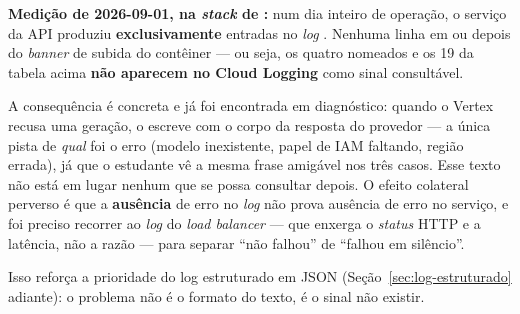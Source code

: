 \begin{atencao}
\textbf{Medição de 2026-09-01, na \emph{stack} de :} num dia inteiro
de operação, o serviço da API produziu \textbf{exclusivamente} entradas no
\emph{log} . Nenhuma linha em
 ou  depois do \emph{banner} de subida do
contêiner --- ou seja, os quatro  nomeados e os 19 
da tabela acima \textbf{não aparecem no Cloud Logging} como sinal consultável.

A consequência é concreta e já foi encontrada em diagnóstico: quando o Vertex
recusa uma geração, o  escreve
 com o corpo da resposta do provedor --- a
única pista de \emph{qual} foi o erro (modelo inexistente, papel de IAM
faltando, região errada), já que o estudante vê a mesma frase amigável nos três
casos. Esse texto não está em lugar nenhum que se possa consultar depois. O
efeito colateral perverso é que a \textbf{ausência} de erro no \emph{log} não
prova ausência de erro no serviço, e foi preciso recorrer ao \emph{log} do
\emph{load balancer} --- que enxerga o \emph{status} HTTP e a latência, não a
razão --- para separar \enquote{não falhou} de \enquote{falhou em silêncio}.

Isso reforça a prioridade do log estruturado em JSON
(Seção~\ref{sec:log-estruturado} adiante): o problema não é o formato do
texto, é o sinal não existir.
\end{atencao}

